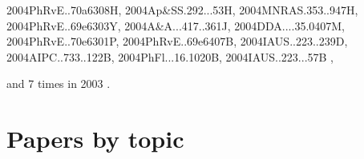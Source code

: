 \documentclass[12pt]{article}
\begin{document}
\begin{description}
{2004PhRvE..70a6308H,%
2004Ap&SS.292...53H,%
2004MNRAS.353..947H,%
2004PhRvE..69e6303Y,%
2004A&A...417..361J,%
2004DDA....35.0407M,%
2004PhRvE..70e6301P,%
2004PhRvE..69e6407B,%
2004IAUS..223..239D,%
2004AIPC..733..122B,%
2004PhFl...16.1020B,%
2004IAUS..223...57B%
},\item
and 7 times in 2003 \citep{
2003A&A...411..321Y,%
2003A&A...407....7Y,%
2003AGUFMGP11C0280M,%
2003ApJ...597L.141H,%
2003eclm.book..269B,%
2003astro.ph..3371B,%
2003PhRvE..68b6304D%
}.
\end{description}

\section{Papers by topic}
\end{document}
